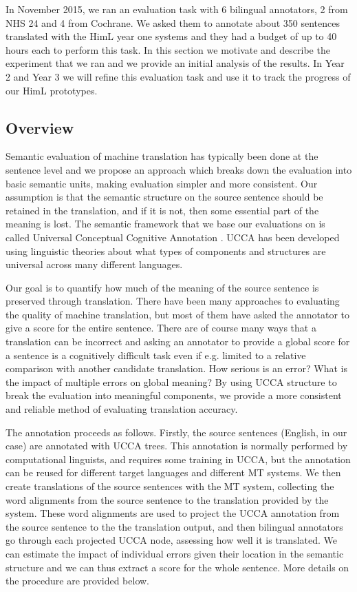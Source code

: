 \documentclass[11pt]{article}
\begin{document}
In November 2015, we ran an evaluation task with 6 bilingual annotators, 2 from NHS 24 and 4 from Cochrane. 
We asked them to annotate about 350 sentences translated with the HimL year one systems 
and they had a budget of  up  to 40 hours each to perform this task. 
In this section we motivate and describe the experiment that we ran and we provide an initial analysis of
the results. In  Year 2 and Year 3 we will refine this evaluation task and use it to track the progress of our HimL prototypes.


\subsection{Overview}

Semantic evaluation of machine translation has typically been done at the sentence level and
we propose an  approach which breaks down the evaluation into basic semantic units, making evaluation 
simpler and more consistent. 
Our  assumption is that the semantic structure on the source sentence should be 
retained in the translation, and if it is not, then some essential part of the meaning 
is
lost. 
The semantic framework that we base our evaluations on is called 
Universal Conceptual Cognitive Annotation .  
UCCA has been developed using linguistic theories about 
what types of components and structures are universal across many different languages.

Our goal is to quantify how much of the meaning of the source sentence is preserved through translation.
There have been many approaches to evaluating the quality of machine translation, but most of them
have asked the annotator to give a score for the entire sentence. There are of course many ways 
that a translation can be incorrect and asking an annotator to provide a global score for a sentence
is a cognitively difficult task even if e.g. limited to a relative comparison
with another candidate translation. How serious is an error? What is the impact of multiple errors on global meaning?
By using UCCA structure to break the evaluation into meaningful components, we provide 
a more consistent and reliable method of evaluating translation accuracy.

The annotation proceeds as follows. Firstly, the source sentences (English, in our case) are annotated with UCCA trees. This
annotation is normally performed by computational linguists, and requires some training in UCCA, but the annotation can be 
reused for different target languages and different MT systems. 
We then create translations of the source sentences with the
MT system, collecting the word alignments from 
%
the
source sentence to 
the
translation provided by the system. These word
alignments are used to project the UCCA annotation from the source sentence to the the translation output, and then bilingual
annotators go through each projected UCCA node, assessing how well it is translated.  
We can estimate the impact of individual errors given their location in the semantic structure 
and we can thus extract a score for the whole sentence. More details on the procedure are provided 
below.
\end{document}
